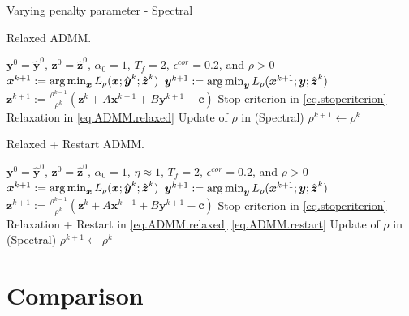 \documentclass[8pt,red]{beamer}
\theoremstyle{plain}
\theoremstyle{definition}
\theoremstyle{remark}
\newcommand{\refalg}[1]{Algorithm~\ref{#1}}
\newcommand{\argmin}{\operatornamewithlimits{\mathrm{arg\,min}}}
\newcommand{\bi}[1]{\ensuremath{\boldsymbol{#1}}}
\begin{document}
\begin{frame}{Varying penalty parameter - Spectral}
\begin{algorithm}[H]
  \scriptsize
  \caption{Relaxed ADMM.}
  \label{alg:prototype.vp-R-Spectral}
  \begin{algorithmic}[1]
    \Require
    $\bi{y}^{0} = \hat{\bi{y}}^{0}$, $\bi{z}^{0}=\hat{\bi{z}}^{0}$, $\alpha_{0}=1$, $T_{f} = 2$, $\epsilon^{cor} = 0.2$, and $\rho > 0$ 
    \State
    $\bi{x}^{k+1} 
    := \argmin_{\bi{x}} L_{\rho}(\bi{x};\hat{\bi{y}}^{k};\hat{\bi{z}}^{k})$ 
    \State
    $\bi{y}^{k+1} 
    := \argmin_{\bi{y}} L_{\rho}(\bi{x}^{k+1};\bi{y};\hat{\bi{z}}^{k})$ 
    \State
    $\bi{z}^{k+1} 
  := \frac{\rho^{k-1}}{\rho^{k}} \left( \bi{z}^{k} + A \bi{x}^{k+1} + B \bi{y}^{k+1} - \bi{c} \right)$ 
    \State
    Stop criterion in \eqref{eq.stopcriterion}
    \State
    Relaxation in \eqref{eq.ADMM.relaxed}
    \State
    Update of $\rho$ in (Spectral)
    \Else
    \State
    $\rho^{k+1} \leftarrow \rho^{k}$
    \EndIf
    \EndFor
  \end{algorithmic}
\end{algorithm}

\begin{algorithm}[H]
  \scriptsize
  \caption{Relaxed + Restart ADMM.}
  \label{alg:prototype.vp-RR-Spectral}
  \begin{algorithmic}[1]
    \Require
    $\bi{y}^{0} = \hat{\bi{y}}^{0}$, $\bi{z}^{0}=\hat{\bi{z}}^{0}$, 
    $\alpha_{0}=1$, $\eta \approx 1$, $T_{f} = 2$, $\epsilon^{cor} = 0.2$, and $\rho > 0$ 
    \State
    $\bi{x}^{k+1} 
    := \argmin_{\bi{x}} L_{\rho}(\bi{x};\hat{\bi{y}}^{k};\hat{\bi{z}}^{k})$ 
    \State
    $\bi{y}^{k+1} 
    := \argmin_{\bi{y}} L_{\rho}(\bi{x}^{k+1};\bi{y};\hat{\bi{z}}^{k})$ 
    \State
    $\bi{z}^{k+1} 
  := \frac{\rho^{k-1}}{\rho^{k}} \left( \bi{z}^{k} + A \bi{x}^{k+1} + B \bi{y}^{k+1} - \bi{c} \right)$ 
    \State
    Stop criterion in \eqref{eq.stopcriterion}
    \State
    Relaxation + Restart in \eqref{eq.ADMM.relaxed} \eqref{eq.ADMM.restart}
    \State
    Update of $\rho$ in (Spectral)
    \Else
    \State
    $\rho^{k+1} \leftarrow \rho^{k}$
    \EndIf
    \EndFor
  \end{algorithmic}
\end{algorithm}
\end{frame}

\section{Comparison}
\end{document}

